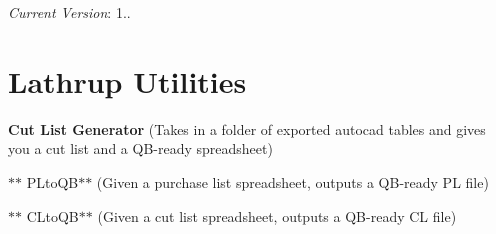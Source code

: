 {\itshape Current Version}\+: 1..

\section*{Lathrup Utilities}


\begin{DoxyEnumerate}
\item {\bfseries Cut List Generator} (Takes in a folder of exported autocad tables and gives you a cut list and a Q\+B-\/ready spreadsheet)
\item $\ast$$\ast$ P\+Lto\+Q\+B$\ast$$\ast$ (Given a purchase list spreadsheet, outputs a Q\+B-\/ready P\+L file)
\item $\ast$$\ast$ C\+Lto\+Q\+B$\ast$$\ast$ (Given a cut list spreadsheet, outputs a Q\+B-\/ready C\+L file) 
\end{DoxyEnumerate}